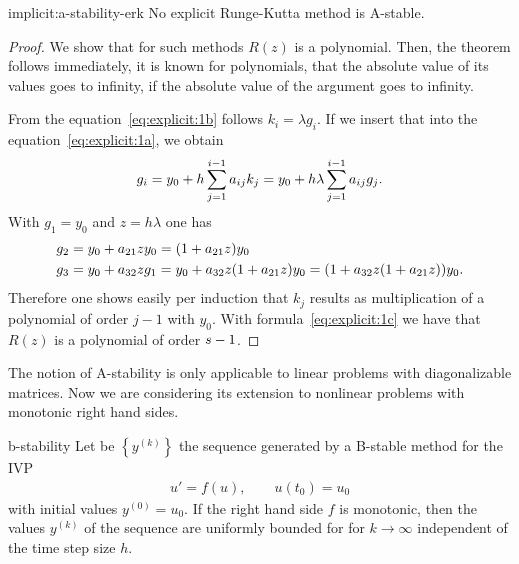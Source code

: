 \begin{Theorem}{implicit:a-stability-erk}
  No explicit Runge-Kutta method is A-stable.
\end{Theorem}

\begin{proof}
  We show that for such methods $R(z)$ is a polynomial.  Then, the
  theorem follows immediately, it is known for polynomials, that the
  absolute value of its values goes to infinity, if the absolute value
  of the argument goes to infinity.
  
  From the equation~\eqref{eq:explicit:1b} follows $k_i = \lambda
  g_i$. If we insert that into the equation~\eqref{eq:explicit:1a},
  we obtain
  \begin{gather*}
    g_i = y_0 + h \sum_{j=1}^{i-1} a_{ij}k_j = y_0 + h\lambda
    \sum_{j=1}^{i-1} a_{ij} g_j.
  \end{gather*}
  With $g_1 = y_0$ and $z=h\lambda$ one has
  \begin{align*}
    g_2 &= y_0+ a_{21} z y_0 = (1+a_{21}z) y_0\\
    g_3 &= y_0 +  a_{32} z g_1 =  y_0 +  a_{32} z (1+a_{21} z) y_0 =
    (1+a_{32} z(1+a_{21} z)) y_0.
  \end{align*}
	Therefore one shows easily per induction that $k_j$ results as
	multiplication of a polynomial of order $j-1$ with $y_0$. 
  With formula~\eqref{eq:explicit:1c} we have that $R(z)$ is a
  polynomial of order $s-1$.
\end{proof}



\begin{remark}
  The notion of A-stability is only applicable to linear problems with
  diagonalizable matrices. Now we are considering its extension to
  nonlinear problems with monotonic right hand sides.
\end{remark}



\begin{Theorem}{b-stability}
  Let be $\left\{y^{(k)}\right\}$ the sequence generated by a
  B-stable method for the IVP
  \begin{gather*}
    u'=f(u), \qquad u(t_0) = u_0
  \end{gather*}
  with initial values $y^{(0)} = u_0$. If the right hand side $f$ is
  monotonic, then the values $y^{(k)}$ of the sequence are uniformly
  bounded for for $k\to\infty$ independent of the time step size $h$.
\end{Theorem}

